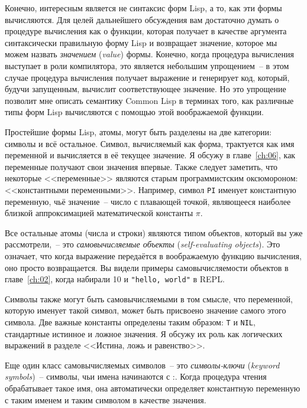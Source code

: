 Конечно, интересным является не синтаксис форм Lisp, а то, как эти формы вычисляются. Для
целей дальнейшего обсуждения вам достаточно думать о процедуре вычисления как о функции,
которая получает в качестве аргумента синтаксически правильную форму Lisp и возвращает
значение, которое мы можем назвать \textit{значением} (\textit{value}) формы. Конечно,
когда процедура вычисления выступает в роли компилятора, это является небольшим упрощением~-- в
этом случае процедура вычисления получает выражение и генерирует код, который, будучи
запущенным, вычислит соответствующее значение. Но это упрощение позволит мне описать
семантику Common Lisp в терминах того, как различные типы форм Lisp вычисляются с помощью
этой воображаемой функции.

Простейшие формы Lisp, атомы, могут быть разделены на две категории: символы и всё
остальное. Символ, вычисляемый как форма, трактуется как имя переменной и вычисляется в её
текущее значение. Я обсужу в главе~\ref{ch:06}, как
переменные получают свои значения впервые. Также следует заметить, что некоторые
<<переменные>> являются старым программистским оксюмороном: <<константными
переменными>>. Например, символ \lstinline{PI} именует константную переменную, чьё
значение~-- число с плавающей точкой, являющееся наиболее близкой аппроксимацией
математической константы $\pi$.

Все остальные атомы (числа и строки) являются типом объектов, который вы уже
рассмотрели,~-- это \textit{самовычисляемые объекты} (\textit{self-evaluating
  objects}). Это означает, что когда выражение передаётся в воображаемую функцию
вычисления, оно просто возвращается. Вы видели примеры самовычисляемости объектов в
главе~\ref{ch:02}, когда набирали 10 и \lstinline{"hello, world"} в REPL.

Символы также могут быть самовычисляемыми в том смысле, что переменной, которую именует
такой символ, может быть присвоено значение самого этого символа. Две важные константы
определены таким образом: \lstinline{T} и \lstinline{NIL}, стандартные истинное и ложное
значения. Я обсужу их роль как логических выражений в разделе <<Истина, ложь и равенство>>.

Еще один класс самовычисляемых символов~-- это \textit{символы-ключи} (\textit{keyword
  symbols})~-- символы, чьи имена начинаются с :. Когда процедура чтения обрабатывает
такое имя, она автоматически определяет константную переменную с таким именем и таким
символом в качестве значения.

